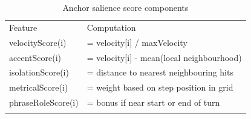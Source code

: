 \begin{longtable}[]{@{}
  >{\raggedright\arraybackslash}p{}
  >{\raggedright\arraybackslash}p{}@{}}
\caption{Anchor salience score components}\label{tab:anchor-score-components}\\
\toprule\noalign{}
\begin{minipage}[b]{\linewidth}\centering
Feature
\end{minipage} & \begin{minipage}[b]{\linewidth}\centering
Computation
\end{minipage} \\
\begin{minipage}[b]{\linewidth}\raggedright
velocityScore(i)
\end{minipage} & \begin{minipage}[b]{\linewidth}\raggedright
= velocity{[}i{]} / maxVelocity
\end{minipage} \\
\begin{minipage}[b]{\linewidth}\raggedright
accentScore(i)
\end{minipage} & \begin{minipage}[b]{\linewidth}\raggedright
= velocity{[}i{]} - mean(local neighbourhood)
\end{minipage} \\
\begin{minipage}[b]{\linewidth}\raggedright
isolationScore(i)
\end{minipage} & \begin{minipage}[b]{\linewidth}\raggedright
= distance to nearest neighbouring hits
\end{minipage} \\
\begin{minipage}[b]{\linewidth}\raggedright
metricalScore(i)
\end{minipage} & \begin{minipage}[b]{\linewidth}\raggedright
= weight based on step position in grid
\end{minipage} \\
\begin{minipage}[b]{\linewidth}\raggedright
phraseRoleScore(i)
\end{minipage} & \begin{minipage}[b]{\linewidth}\raggedright
= bonus if near start or end of turn
\end{minipage} \\
\midrule\noalign{}
\endhead
\bottomrule\noalign{}
\endlastfoot
\end{longtable}


